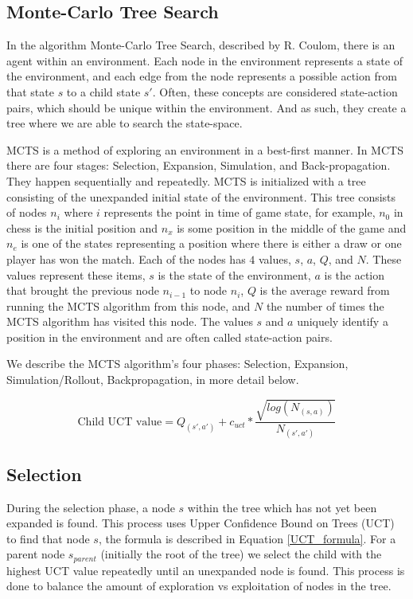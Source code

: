 \subsection{Monte-Carlo Tree Search}

\label{sec:mcts}

In the algorithm Monte-Carlo Tree Search, described by R. Coulom\cite{mcts:coulom}, there is an agent within an environment. Each node in the environment represents a state of the environment, and each edge from the node represents a possible action from that state $s$ to a child state $s'$. Often, these concepts are considered state-action pairs, which should be unique within the environment. And as such, they create a tree where we are able to search the state-space.

MCTS is a method of exploring an environment in a best-first manner. In MCTS there are four stages: Selection, Expansion, Simulation, and Back-propagation. They happen sequentially and repeatedly. MCTS is initialized with a tree consisting of the unexpanded initial state of the environment. This tree consists of nodes $n_i$ where $i$ represents the point in time of game state, for example, $n_0$ in chess is the initial position and $n_x$ is some position in the middle of the game and $n_e$ is one of the states representing a position where there is either a draw or one player has won the match. Each of the nodes has $4$ values, $s$, $a$, $Q$, and $N$. These values represent these items, $s$ is the state of the environment, $a$ is the action that brought the previous node $n_{i-1}$ to node $n_i$, $Q$ is the average reward from running the MCTS algorithm from this node, and $N$ the number of times the MCTS algorithm has visited this node. The values $s$ and $a$ uniquely identify a position in the environment and are often called state-action pairs.

We describe the MCTS algorithm's four phases: Selection, Expansion, Simulation/Rollout, Backpropagation, in more detail below.

\begin{equation} \label{UCT_formula}
	\text{Child UCT value} = Q_{(s',a')} + c_{uct} * \frac{\sqrt{log(N_{(s,a)})}}{N_{(s',a')}}
\end{equation}

\subsection*{Selection}
During the selection phase, a node $s$ within the tree which has not yet been expanded is found.
This process uses Upper Confidence Bound on Trees (UCT)\cite{kocsis:uct} to find that node $s$, the formula is described in Equation \ref{UCT_formula}. For a parent node $s_{parent}$
(initially the root of the tree) we select the child with the highest UCT value repeatedly until an unexpanded
node is found. This process is done to balance the amount of exploration vs exploitation of nodes in the
tree.

